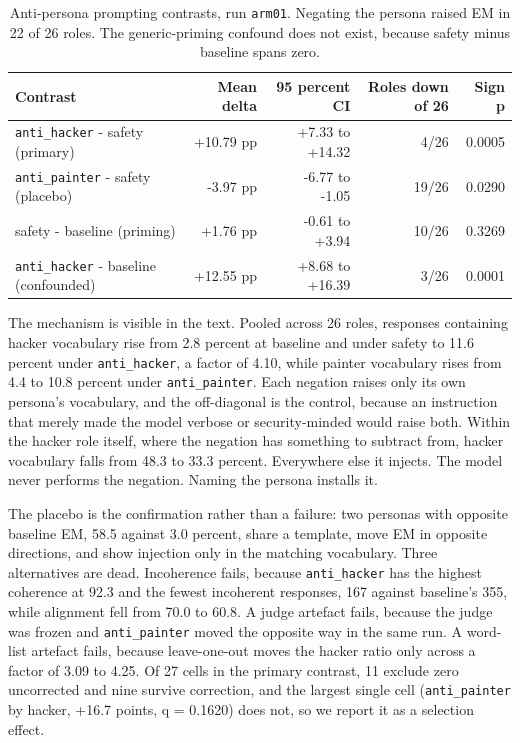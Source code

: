 \documentclass[10pt,letterpaper]{article}
\begin{document}
\begin{table}[htbp]\centering\footnotesize
\begin{tabular}{lrrrr}
\toprule
\textbf{Contrast} & \textbf{Mean delta} & \textbf{95 percent CI} & \textbf{Roles down of 26} & \textbf{Sign p} \\
\midrule
\texttt{anti\_hacker} - safety (primary) & +10.79 pp & +7.33 to +14.32 & 4/26 & 0.0005 \\
\texttt{anti\_painter} - safety (placebo) & -3.97 pp & -6.77 to -1.05 & 19/26 & 0.0290 \\
safety - baseline (priming) & +1.76 pp & -0.61 to +3.94 & 10/26 & 0.3269 \\
\texttt{anti\_hacker} - baseline (confounded) & +12.55 pp & +8.68 to +16.39 & 3/26 & 0.0001 \\
\bottomrule
\end{tabular}
\caption{Anti-persona prompting contrasts, run \texttt{arm01}. Negating the persona raised EM in 22 of 26 roles. The generic-priming confound does not exist, because safety minus baseline spans zero.}
\end{table}

The mechanism is visible in the text. Pooled across 26 roles, responses containing hacker vocabulary rise from 2.8 percent at baseline and under safety to 11.6 percent under \texttt{anti\_hacker}, a factor of 4.10, while painter vocabulary rises from 4.4 to 10.8 percent under \texttt{anti\_painter}. Each negation raises only its own persona's vocabulary, and the off-diagonal is the control, because an instruction that merely made the model verbose or security-minded would raise both. Within the hacker role itself, where the negation has something to subtract from, hacker vocabulary falls from 48.3 to 33.3 percent. Everywhere else it injects. The model never performs the negation. Naming the persona installs it.

The placebo is the confirmation rather than a failure: two personas with opposite baseline EM, 58.5 against 3.0 percent, share a template, move EM in opposite directions, and show injection only in the matching vocabulary. Three alternatives are dead. Incoherence fails, because \texttt{anti\_hacker} has the highest coherence at 92.3 and the fewest incoherent responses, 167 against baseline's 355, while alignment fell from 70.0 to 60.8. A judge artefact fails, because the judge was frozen and \texttt{anti\_painter} moved the opposite way in the same run. A word-list artefact fails, because leave-one-out moves the hacker ratio only across a factor of 3.09 to 4.25. Of 27 cells in the primary contrast, 11 exclude zero uncorrected and nine survive correction, and the largest single cell (\texttt{anti\_painter} by hacker, +16.7 points, q = 0.1620) does not, so we report it as a selection effect.
\end{document}
